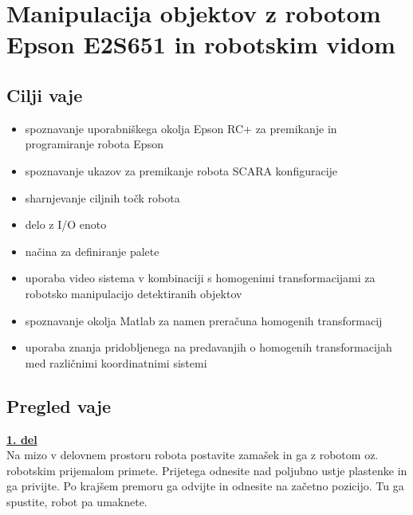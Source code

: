 \chapter{Manipulacija objektov z robotom Epson E2S651 in robotskim vidom} %

\vspace{-3.5cm}

\begin{mdframed}[backgroundcolor=green!20, shadow=true,roundcorner=8pt]
\vspace{-0.35cm}
\section{Cilji vaje}
\begin{itemize}
\item spoznavanje uporabniškega okolja Epson RC+ za premikanje in programiranje robota Epson
\item spoznavanje ukazov za premikanje robota SCARA konfiguracije
\item sharnjevanje ciljnih točk robota
\item delo z I/O enoto
\item načina za definiranje palete
\item uporaba video sistema v kombinaciji s homogenimi transformacijami  za robotsko manipulacijo detektiranih objektov
\item spoznavanje okolja Matlab za namen preračuna homogenih transformacij
\item uporaba znanja pridobljenega na predavanjih o homogenih transformacijah med različnimi koordinatnimi sistemi
\end{itemize}
\end{mdframed}

\section{Pregled vaje}
\vspace{0.3cm}%
\underline{\textbf{1. del}} \\%

Na mizo v delovnem prostoru robota postavite zamašek in ga z robotom
oz. robotskim prijemalom primete. Prijetega odnesite nad poljubno
ustje plastenke in ga privijte.  Po krajšem premoru ga odvijte in
odnesite na začetno pozicijo. Tu ga spustite, robot pa umaknete.

